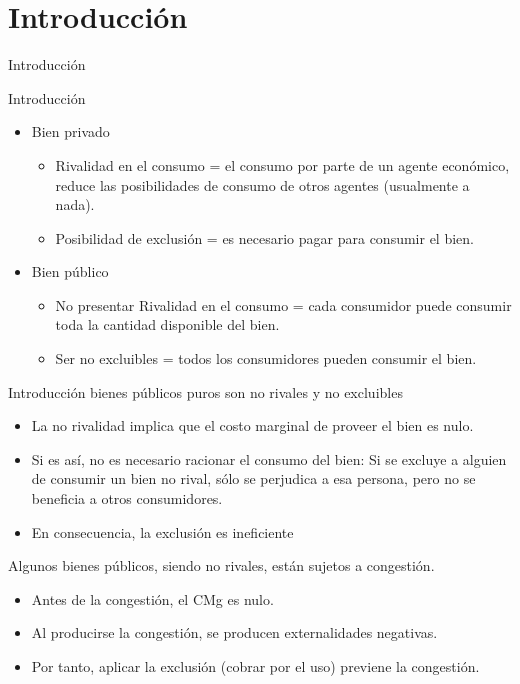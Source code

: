 \section{Introducción}

\begin{frame}{Introducción}
	\begin{center}
		
	\end{center}
\end{frame}
\begin{frame}{Introducción}
	\begin{itemize}
		\item Bien privado
			\begin{itemize}
				\item Rivalidad en el consumo = el consumo por parte de un agente económico, reduce las posibilidades de consumo de otros agentes (usualmente a nada).
				\item Posibilidad de exclusión = es necesario pagar para consumir el bien.
			\end{itemize}
		\item Bien público
			\begin{itemize}
				\item No presentar Rivalidad en el consumo = cada consumidor puede consumir toda la cantidad disponible del bien.
				\item Ser  no excluibles =  todos los consumidores pueden consumir el bien.
			\end{itemize}
	\end{itemize}
\end{frame}
\begin{frame}{Introducción}
bienes públicos puros son no rivales y no  excluibles
	\begin{itemize}
		\item La no rivalidad implica que el costo marginal de proveer el bien es nulo.
		\item Si es así, no es necesario racionar el consumo del bien: Si se excluye a alguien de consumir un bien no rival, sólo se perjudica a esa persona, pero no se beneficia a otros consumidores.
		\item En consecuencia, la exclusión es ineficiente
	\end{itemize}

Algunos bienes públicos, siendo no rivales, están sujetos a congestión.
	\begin{itemize}
		\item Antes de la congestión, el CMg es nulo.
		\item Al producirse la congestión, se producen externalidades negativas.
		\item Por tanto, aplicar la exclusión (cobrar por el uso) previene la congestión.
	\end{itemize}
\end{frame}
